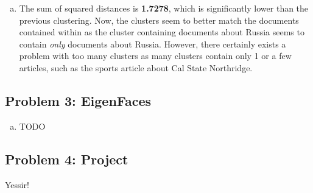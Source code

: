 \documentclass[twoside,11pt]{article}
\newcommand{\figdir}{figs}
\theoremstyle{definition}
\begin{document}
\begin{enumerate}[(a)]
\item The sum of squared distances is \textbf{1.7278}, which is significantly lower than the previous clustering.
Now, the clusters seem to better match the documents contained within as the cluster containing documents about Russia seems to contain \emph{only} documents about Russia.
However, there certainly exists a problem with too many clusters as many clusters contain only 1 or a few articles, such as the sports article about Cal State Northridge.

\end{enumerate}


\subsection*{Problem 3: EigenFaces}

\begin{enumerate}[(a)]
\item TODO
\end{enumerate}


\subsection*{Problem 4: Project}

Yessir!
\end{document}
